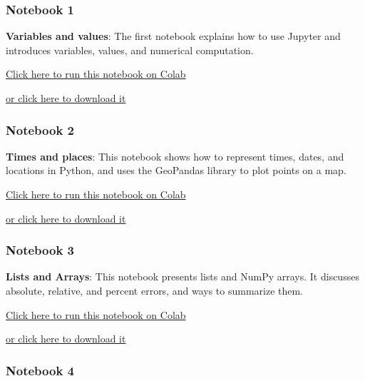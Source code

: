 \hypertarget{notebook-1}{%
\subsubsection{Notebook 1}\label{notebook-1}}

\textbf{Variables and values}: The first notebook explains how to use
Jupyter and introduces variables, values, and numerical computation.

\href{https://colab.research.google.com/github/AllenDowney/ElementsOfDataScience/blob/v1/01_variables.ipynb}{Click
here to run this notebook on Colab}

\href{https://github.com/AllenDowney/ElementsOfDataScience/raw/v1/01_variables.ipynb}{or
click here to download it}

\hypertarget{notebook-2}{%
\subsubsection{Notebook 2}\label{notebook-2}}

\textbf{Times and places}: This notebook shows how to represent times,
dates, and locations in Python, and uses the GeoPandas library to plot
points on a map.

\href{https://colab.research.google.com/github/AllenDowney/ElementsOfDataScience/blob/v1/02_times.ipynb}{Click
here to run this notebook on Colab}

\href{https://github.com/AllenDowney/ElementsOfDataScience/raw/v1/02_times.ipynb}{or
click here to download it}

\hypertarget{notebook-3}{%
\subsubsection{Notebook 3}\label{notebook-3}}

\textbf{Lists and Arrays}: This notebook presents lists and NumPy
arrays. It discusses absolute, relative, and percent errors, and ways to
summarize them.

\href{https://colab.research.google.com/github/AllenDowney/ElementsOfDataScience/blob/v1/03_arrays.ipynb}{Click
here to run this notebook on Colab}

\href{https://github.com/AllenDowney/ElementsOfDataScience/raw/v1/03_arrays.ipynb}{or
click here to download it}

\hypertarget{notebook-4}{%
\subsubsection{Notebook 4}\label{notebook-4}}

